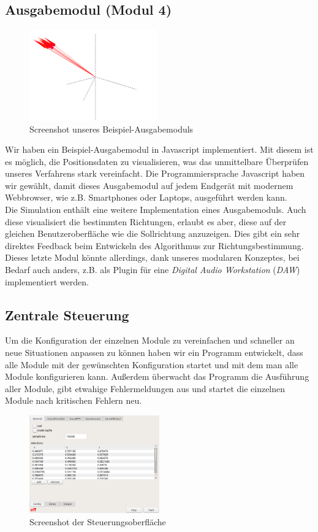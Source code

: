 \subsection{Ausgabemodul (Modul 4)}
\begin{figure}
	\centering
	\includegraphics[width=0.49\textwidth]{img/output}
	\caption{Screenshot unseres Beispiel-Ausgabemoduls}
	\label{fig:output}
\end{figure}
Wir haben ein Beispiel-Ausgabemodul in Javascript implementiert. Mit diesem ist es möglich, die Positionsdaten zu visualisieren, was das unmittelbare Überprüfen unseres Verfahrens stark vereinfacht. Die Programmiersprache Javascript haben wir gewählt, damit dieses Ausgabemodul auf jedem Endgerät mit modernem Webbrowser, wie z.B. Smartphones oder Laptops, ausgeführt werden kann.\\
Die Simulation enthält eine weitere Implementation eines Ausgabemoduls. Auch diese visualisiert die bestimmten Richtungen, erlaubt es aber, diese auf der gleichen Benutzeroberfläche wie die Sollrichtung anzuzeigen. Dies gibt ein sehr direktes Feedback beim Entwickeln des Algorithmus zur Richtungsbestimmung. Dieses letzte Modul könnte allerdings, dank unseres modularen Konzeptes, bei Bedarf auch anders, z.B. als Plugin für eine \textit{Digital Audio Workstation} (\textit{DAW}) implementiert werden.

\subsection{Zentrale Steuerung}
Um die Konfiguration der einzelnen Module zu vereinfachen und schneller an neue Situationen anpassen zu können haben wir ein Programm entwickelt, dass alle Module mit der gewünschten Konfiguration startet und mit dem man alle Module konfigurieren kann. Außerdem überwacht das Programm die Ausführung aller Module, gibt etwahige Fehlermeldungen aus und startet die einzelnen Module nach kritischen Fehlern neu.

\begin{figure}[H]
  \centering
  \includegraphics[width=0.5\textwidth]{img/GUI}
  \caption{Screenshot der Steuerungsoberfläche}
  \label{fig:gui_screenshot}
\end{figure}


